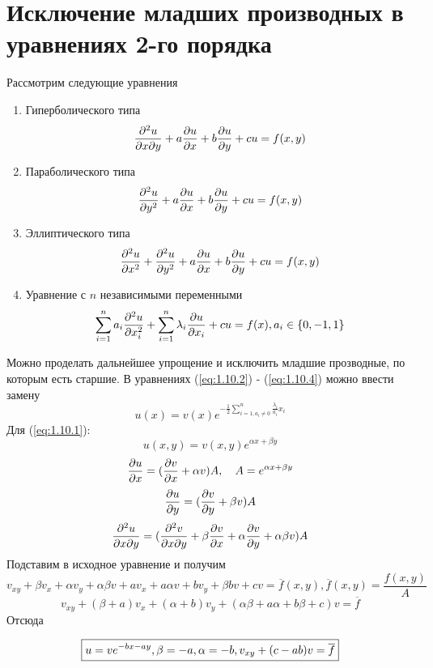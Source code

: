 \documentclass[../main.tex]{subfiles}
\begin{document}
\section{Исключение младших производных в уравнениях 2-го порядка}
Рассмотрим следующие уравнения
{\bf
\begin{enumerate}
	\item Гиперболического типа
	      \begin{equation} \label{eq:1.10.1}
			\frac{\partial ^2 u}{\partial x \partial y} + a \frac{\partial u}{\partial x} + b \frac{\partial u}{\partial y} + cu = f(x, y)
	      \end{equation}
	\item Параболического типа
	      \begin{equation} \label{eq:1.10.2}
			\frac{\partial ^2 u}{\partial y^2} + a \frac{\partial u}{\partial x} + b \frac{\partial u}{\partial y} + cu = f(x, y)
	      \end{equation}
	\item Эллиптического типа
	      \begin{equation} \label{eq:1.10.3}
		      \frac{\partial ^2 u}{\partial x^2} + \frac{\partial^2 u}{\partial y^2} + a \frac{\partial u}{\partial x} + b \frac{\partial u}{\partial y} + cu = f(x, y)
	      \end{equation}
	\item Уравнение с $n$ независимыми переменными
	      \begin{equation} \label{eq:1.10.4}
		      \sum_{i=1}^n a_i \frac{\partial^2 u }{\partial x_i^2} + \sum_{i=1}^n \lambda_i \frac{\partial u}{\partial x_i} + cu = f(x), a_i \in \{0, -1, 1\}
	      \end{equation}
\end{enumerate}}
Можно проделать дальнейшее упрощение и исключить младшие прозводные, по которым есть старшие.
В уравнениях (\ref{eq:1.10.2}) - (\ref{eq:1.10.4}) можно ввести замену
$$u(x) = v(x)e^{-\frac{1}{2} \sum \limits_{i=1, a_i \neq 0}^n \frac{\lambda_i}{a_i} x_i}$$
Для (\ref{eq:1.10.1}):
$$u(x,y) = v(x,y) e ^ {\alpha x + \beta y}$$
$$\frac{\partial u}{\partial x} = (\frac{\partial v}{\partial x}+\alpha v)A, \quad A=e ^ {\alpha x + \beta y}$$
$$\frac{\partial u}{\partial y} = (\frac{\partial v}{\partial y}+\beta v)A$$
$$\frac{\partial^2 u}{\partial x \partial y} = (\frac{\partial^2 v}{\partial x \partial y} + \beta \frac{\partial v}{\partial x} + \alpha \frac{\partial v}{\partial y} + \alpha \beta v)A$$
Подставим в исходное уравнение и получим
$$v_{xy} + \beta v_x + \alpha v_y + \alpha \beta v + a v_x + a \alpha v + b v_y + \beta b v + cv = \overline{f}(x,y), \overline{f}(x,y) = \frac{f(x,y)}{A}$$
$$v_{xy} + (\beta + a)v_x + (\alpha + b)v_y + (\alpha \beta + a \alpha + b \beta + c)v = \overline{f}$$
Отсюда

\begin{equation*}
	\boxed{
		u = ve^{-bx - ay}, \\
		\beta = -a, \alpha = -b,\\
		v_{xy} + (c-ab)v = \overline{f}
	}
\end{equation*}
\end{document}
